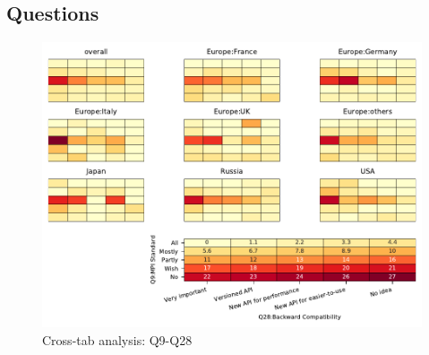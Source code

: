
\subsection{Questions}


\begin{figure}
\begin{center}
\includegraphics[width=12cm]{../pdfs/Q9-Q28.pdf}
\caption{Cross-tab analysis: Q9-Q28}
\label{fig:Q9-Q28}
\end{center}
\end{figure}
